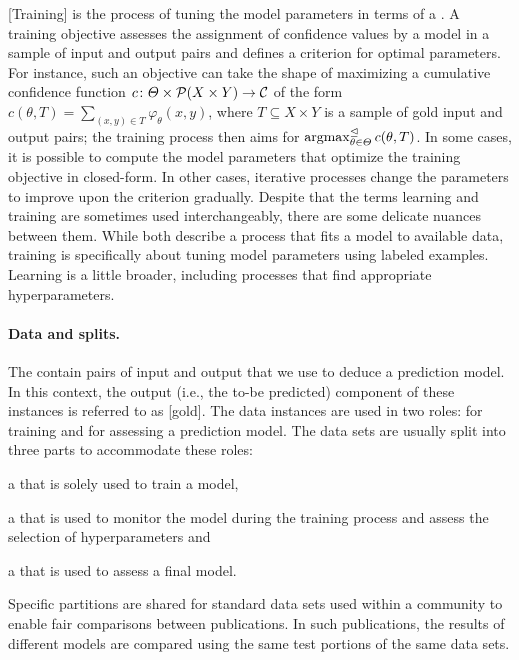 \documentclass[../document.tex]{subfiles}
\begin{document}
    [Training] is the process of tuning the model parameters in terms of a .
    A training objective assesses the assignment of confidence values by a model in a sample of input and output pairs and defines a criterion for optimal parameters.
    For instance, such an objective can take the shape of maximizing a cumulative confidence function \(c\colon \varTheta \times \mathcal{P}(X \times Y) \to \mathcal{C}\) of the form \(c(\theta, T) = \sum_{(x,y) \in T} \varphi_\theta(x, y)\), where \(T \subseteq X \times Y\) is a sample of gold input and output pairs; the training process then aims for \(\operatorname{arg max}^{\mathrel{\unlhd}}_{\theta \in \varTheta} c(\theta, T)\).
    In some cases, it is possible to compute the model parameters that optimize the training objective in closed-form.
    In other cases, iterative processes change the parameters to improve upon the criterion gradually.
    Despite that the terms learning and training are sometimes used interchangeably, there are some delicate nuances between them.
    While both describe a process that fits a model to available data, training is specifically about tuning model parameters using labeled examples.
    Learning is a little broader, including processes that find appropriate hyperparameters.

    \paragraph{Data and splits.}
    The  contain pairs of input and output that we use to deduce a prediction model.
    In this context, the output (i.e., the to-be predicted) component of these instances is referred to as [gold].
    The data instances are used in two roles: for training and for assessing a prediction model.
    The data sets are usually split into three parts to accommodate these roles:
    \begin{inparaenum}
        \item a  that is solely used to train a model,
        \item a  that is used to monitor the model during the training process and assess the selection of hyperparameters and
        \item a  that is used to assess a final model.
    \end{inparaenum}
    Specific partitions are shared for standard data sets used within a community to enable fair comparisons between publications.
    In such publications, the results of different models are compared using the same test portions of the same data sets.
\end{document}
